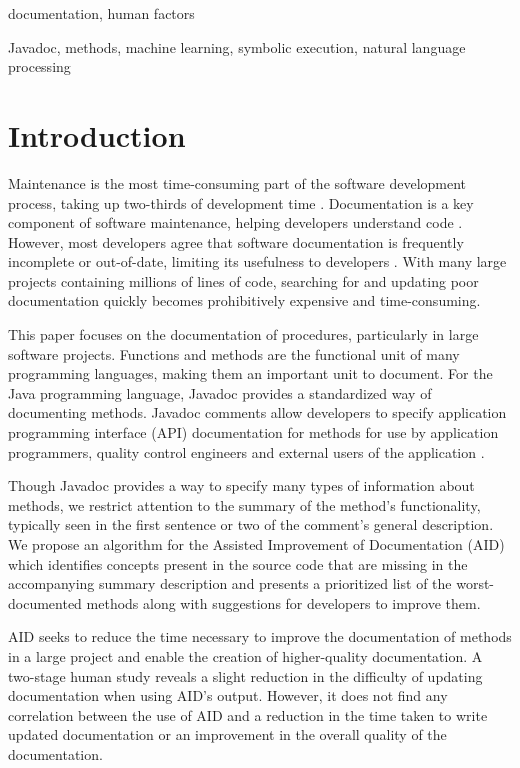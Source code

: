 \documentclass[preprint]{sigplanconf}
\begin{document}
\terms
documentation, human factors

\keywords
Javadoc, methods, machine learning, symbolic execution, natural language processing

\section{Introduction}
Maintenance is the most time-consuming part of the software development process, taking up two-thirds of development time \cite{buse10}. Documentation is a key component of software maintenance, helping developers understand code \cite{desouza}. However, most developers agree that software documentation is frequently incomplete or out-of-date, limiting its usefulness to developers \cite{lethbridge}. With many large projects containing millions of lines of code, searching for and updating poor documentation quickly becomes prohibitively expensive and time-consuming.

This paper focuses on the documentation of procedures, particularly in large software projects. Functions and methods are the functional unit of many programming languages, making them an important unit to document. For the Java programming language, Javadoc provides a standardized way of documenting methods. Javadoc comments allow developers to specify application programming interface (API) documentation for methods for use by application programmers, quality control engineers and external users of the application \cite{kramer}.

Though Javadoc provides a way to specify many types of information about methods, we restrict attention to the summary of the method's functionality, typically seen in the first sentence or two of the comment's general description. We propose an algorithm for the Assisted Improvement of Documentation (AID) which identifies concepts present in the source code that are missing in the accompanying summary description and presents a prioritized list of the worst-documented methods along with suggestions for developers to improve them.

AID seeks to reduce the time necessary to improve the documentation of methods in a large project and enable the creation of higher-quality documentation. A two-stage human study reveals a slight reduction in the difficulty of updating documentation when using AID's output. However, it does not find any correlation between the use of AID and a reduction in the time taken to write updated documentation or an improvement in the overall quality of the documentation.
\end{document}
